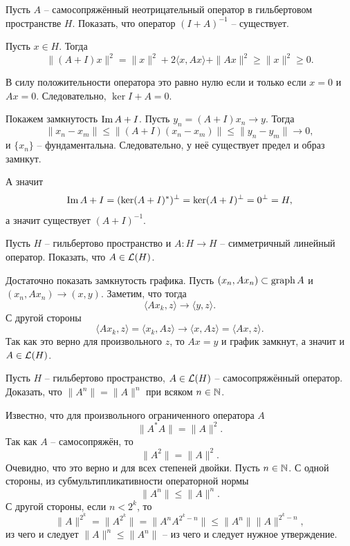 \begin{task}[11.7]
    Пусть $A$ -- самосопряжённый неотрицательный оператор в гильбертовом пространстве $H$.
    Показать, что оператор $(I + A)^{-1}$ -- существует.
\end{task}
\begin{solution}
    Пусть $x \in H$.
    Тогда
    \[
        \|(A + I)x\|^2 = \|x\|^2 + 2\langle x, Ax \rangle + \|Ax\|^2 \geq \|x\|^2 \geq 0.
    \]
    
    В силу положительности оператора это равно нулю если и только если $x = 0$ и $Ax = 0$.
    Следовательно, $\ker I + A = 0$.

    Покажем замкнутость $\operatorname{Im} A + I$.
    Пусть $y_n = (A + I)x_n \rightarrow y$.
    Тогда
    \[
        \|x_n - x_m\| \leq \|(A + I)(x_n - x_m)\| \leq \|y_n - y_m\| \rightarrow 0,
    \]
    и $\{x_n\}$ -- фундаментальна. Следовательно, у неё существует предел и образ замнкут.

    А значит
    \[
        \operatorname{Im} A + I = (\ker (A + I)^*)^{\perp} = \ker (A + I)^\perp = 0^\perp = H,
    \]
    а значит существует $(A + I)^{-1}$.
\end{solution}
\begin{task}[11.11]
    Пусть $H$ -- гильбертово пространство и $A\colon H \to H$ -- симметричный линейный оператор.
    Показать, что $A \in \mathcal{L}(H)$.
\end{task}
\begin{solution}
    Достаточно показать замкнутость графика.
    Пусть $(x_n, Ax_n) \subset \operatorname{graph} A$ и $(x_n, Ax_n) \rightarrow (x, y)$.
    Заметим, что тогда
    \[
        \langle Ax_k, z \rangle \rightarrow \langle y, z\rangle.
    \]
    С другой стороны
    \[
        \langle Ax_k, z \rangle = \langle x_k, Az \rangle \rightarrow \langle x, Az \rangle = \langle Ax, z\rangle.
    \]
    Так как это верно для произвольного $z$, то $Ax = y$ и график замкнут, а значит и $A \in \mathcal{L}(H)$.
\end{solution}
\begin{task}[11.13]
    Пусть $H$ -- гильбертово пространство, $A \in \mathcal{L}(H)$ -- самосопряжённый оператор.
    Доказать, что $\|A^n\| = \|A\|^n$ при всяком $n \in \mathbb{N}$.
\end{task}
\begin{solution}
    Известно, что для произвольного ограниченного оператора $A$
    \[
        \|A^* A\| = \|A\|^2.
    \]
    Так как $A$ -- самосопряжён, то
    \[
        \|A^2\| = \|A\|^2.
    \]
    Очевидно, что это верно и для всех степеней двойки.
    Пусть $n \in \mathbb{N}$.
    С одной стороны, из субмультипликативности операторной нормы
    \[
        \|A^n\| \leq \|A\|^n.
    \]
    С другой стороны, если $n < 2^{k}$, то 
    \[
        \|A\|^{2^k} = \|A^{2^k}\| = \|A^n A^{2^k - n}\| \leq \|A^n\| \|A\|^{2^k - n},
    \]
    из чего и следует $\|A\|^n \leq \|A^n\|$ -- из чего и следует нужное утверждение.
\end{solution}

